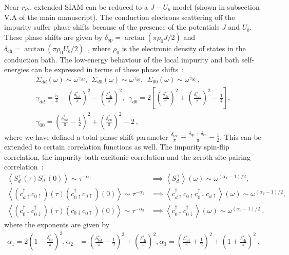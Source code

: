 Near \(r_{c2}\), extended SIAM can be reduced to a \(J-U_b\) model (shown in subsection V.A of the main manuscript). The conduction electrons scattering off the impurity suffer phase shifts because of the presence of the potentials \(J\) and \(U_b\). These phase shifts are given by \(\delta_\text{sp} = \arctan\left(\pi \rho_0 J/2\right)\) and \(\delta_\text{ch} = \arctan\left(\pi \rho_0 U_b/2\right)\)~\cite{si_kotliar_1993,giamarchi2004}, where \(\rho_0\) is the electronic density of states in the conduction bath.
The low-energy behaviour of the local impurity and bath self-energies can be expressed in terms of these phase shifts~\cite{si_kotliar_1993}:
\begin{eqnarray}
	\Sigma_{dd}(\omega) \sim \omega^{\gamma_{dd}}, ~ ~ \Sigma_{d0}(\omega) \sim \omega^{\gamma_{d0}}, ~ ~ \Sigma_{00}(\omega) \sim \omega^{\gamma_{00}}~,\nonumber \\
\gamma_{dd} = \frac{5}{4} - \left(\frac{\delta^*_\text{tot}}{\pi}\right)^2 - \left(\frac{\delta^*_\text{ch}}{\pi}\right)^2, ~ ~ \gamma_{d0} = 2\left[\left( \frac{\delta^*_\text{ch}}{\pi} \right)^2 + \left(\frac{\delta^*_\text{tot}}{\pi}\right)^2 - \frac{1}{4}\right], \nonumber\\
\gamma_{00} = \left(\frac{\delta^*_\text{tot}}{\pi} - \frac{1}{2}\right)^2 + \left(\frac{\delta^*_\text{ch}}{\pi} \right)^2 - 2~,
\end{eqnarray}
where we have defined a total phase shift parameter \(\frac{\delta_\text{tot}}{\pi} \equiv \frac{\delta_\text{sp} + \delta_\text{ch}}{\pi} - \frac{1}{2}\).
This can be extended to certain correlation functions as well. The impurity spin-flip correlation, the impurity-bath excitonic correlation and the zeroth-site pairing correlation~\cite{si_kotliar_1993}:
\begin{eqnarray}
	\left<S_d^+(\tau) S_d^-(0) \right>\sim \tau^{-\alpha_1} &\implies \left<S_d^+\right>(\omega) \sim \omega^{(\alpha_1 - 1)/2},  \nonumber\\
	\left<(c^\dagger_{d \uparrow} c_{0 \uparrow})(\tau) (c^\dagger_{0 \uparrow} c_{d \uparrow})(0)\right>\sim \tau^{-\alpha_2} &\implies \left<c^\dagger_{d \uparrow} c_{0 \uparrow} c^\dagger_{0 \uparrow} c_{d \uparrow}\right>(\omega) \sim \omega^{(\alpha_2 - 1)/2},  \nonumber \\
	\left<(c^\dagger_{0 \uparrow} c^\dagger_{0 \downarrow})(\tau) (c_{0 \downarrow} c_{0 \uparrow})(0)\right> \sim \tau^{-\alpha_3} &\implies \left<c^\dagger_{0 \uparrow} c^\dagger_{ 0\downarrow}\right>(\omega) \sim \omega^{(\alpha_3 - 1)/2}~,
\end{eqnarray}
where the exponents are given by
\begin{eqnarray}
	\alpha_1 = 2\left(1 - \frac{\delta_\text{sp}^*}{\pi}\right)^2, \alpha_2 &= \left(\frac{\delta^*_\text{tot}}{\pi} - \frac{1}{2}\right)^2 + \left(\frac{\delta^*_\text{ch}}{\pi} \right)^2,  \alpha_3 = \left(\frac{\delta^*_\text{tot}}{\pi} + \frac{1}{2}\right)^2 + \left(1 + \frac{\delta^*_\text{ch}}{\pi} \right)^2~.
\end{eqnarray}


